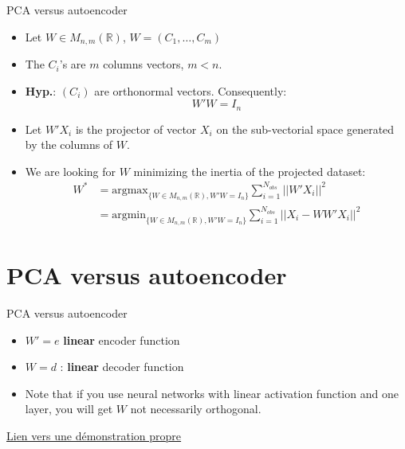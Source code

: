 \documentclass[
  12pt,
  ignorenonframetext,
  compress]{beamer}
\begin{document}
\begin{frame}{PCA versus autoencoder}
\begin{itemize}
\item
  Let \(W \in M_{n,m}(\mathbb{R})\), \(W = (C_1,\dots,C_m)\)
\item
  The \(C_i\)'s are \(m\) columns vectors, \(m < n\).
\item
  \textbf{Hyp.}: \((C_i)\) are orthonormal vectors. Consequently:
  \[W'W = I_n\]
\item
  Let \(W' X_i\) is the projector of vector \(X_i\) on the sub-vectorial
  space generated by the columns of \(W\).
\item
  We are looking for \(W\) minimizing the inertia of the projected
  dataset: \[
  \begin{aligned}
  W^* &=\mbox{argmax}_{\{W \in M_{n,m}(\mathbb{R}), W'W = I_n\}} \sum_{i=1}^{N_{obs}} || W'X_i||^2\\ &=\mbox{argmin}_{\{W \in M_{n,m}(\mathbb{R}), W'W = I_n\}} \sum_{i=1}^{N_{obs}} || X_i - WW'X_i||^2
  \end{aligned}
  \]
\end{itemize}
\end{frame}

\begin{frame}
\end{frame}

\hypertarget{pca-versus-autoencoder-1}{%
\section{PCA versus autoencoder}\label{pca-versus-autoencoder-1}}

\begin{frame}{PCA versus autoencoder}
\begin{itemize}
\item
  \(W' = e\) \textbf{linear} encoder function
\item
  \(W = d\) : \textbf{linear} decoder function
\item
  Note that if you use neural networks with linear activation function
  and one layer, you will get \(W\) not necessarily orthogonal.
\end{itemize}

\href{http://www.xavierdupre.fr/app/mlstatpy/helpsphinx/c_ml/rn/rn_9_auto.html}{Lien
vers une démonstration propre}
\end{frame}

\begin{frame}
\end{frame}
\end{document}
